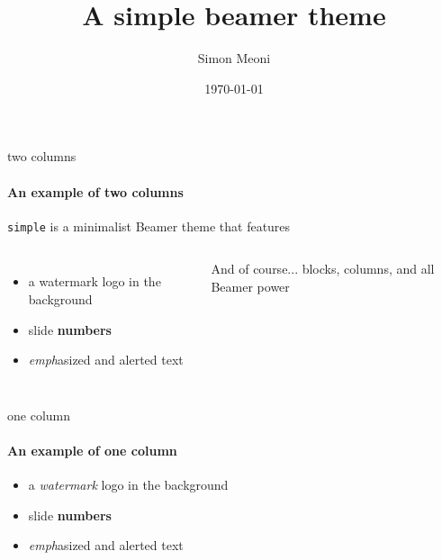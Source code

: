 \documentclass{beamer}
\title{A simple beamer theme}
\subtitle{}
\date{\today}
\author{Simon Meoni}
\begin{document}
\maketitle

\begin{frame}{two columns}
  \framesubtitle{An example of two columns}

  \texttt{simple} is a minimalist Beamer theme that features

  \begin{columns}
      \begin{itemize}
        \item a watermark logo in the background
        \item slide {\bf numbers}
        \item \emph{emph}asized and \alert{alert}ed text
      \end{itemize}

      \begin{block}{And of course...}
         blocks, columns, and all Beamer power
      \end{block}
  \end{columns}
  
\end{frame}

\begin{frame}{one column}
  \framesubtitle{An example of one column}
      \begin{itemize}
        \item a \emph{watermark} logo in the background
        \item slide {\bf numbers}
        \item \emph{emph}asized and \alert{alert}ed text
      \end{itemize}
\end{frame}
\end{document}
